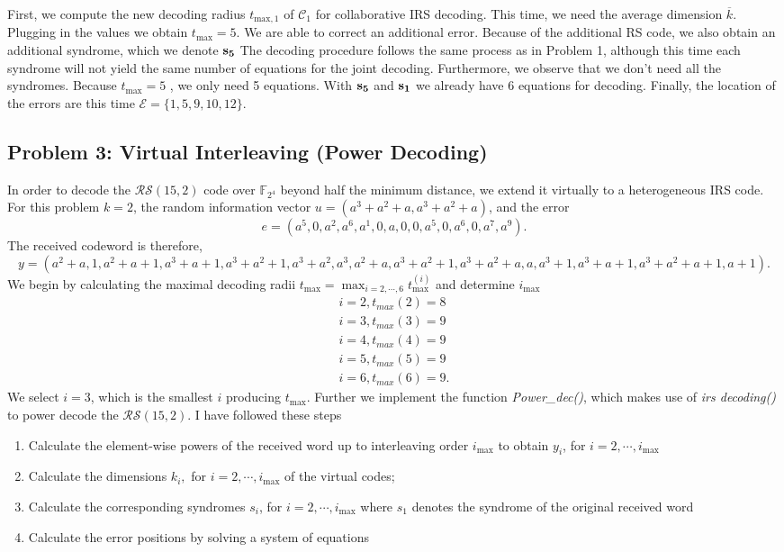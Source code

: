 \documentclass{article}
\begin{document}
First, we compute the new decoding radius $t_{\text{max},1}$ of $\mathcal{C}_1$ for collaborative IRS decoding. This time, we need the average dimension $\overline{k}$. Plugging in the values we obtain $t_{\text{max}} = 5$. We are able to correct an additional error. Because of the additional RS code, we also obtain an additional syndrome, which we denote $\vb{s_5}$
The decoding procedure follows the same process as in Problem 1, although this time each syndrome will not yield the same number of equations for the joint decoding. Furthermore, we observe that we don't need all the syndromes. Because  $t_{\text{max}} = 5$ , we only need 5 equations. With  $\vb{s_5}$  and  $\vb{s_1}$  we already have 6 equations for decoding. Finally, the location of the errors are this time $\mathcal{E} = \{1, 5, 9, 10, 12\}$.

\subsection*{Problem 3: Virtual Interleaving (Power Decoding)}
In order to decode the $\mathcal{RS}(15, 2)$ code over $\mathbb{F}_{2^4}$ beyond half the minimum distance, we extend it virtually to a heterogeneous IRS code. For this problem $k=2$, the random information vector $u=(a^3 + a^2 + a, a^3 + a^2 + a)$, and the error
\begin{equation*}
e=(a^5, 0, a^2, a^6, a^1, 0, a, 0, 0, a^5, 0, a^6, 0, a^7, a^9).
\end{equation*}
The received codeword is therefore,
\begin{equation*}
y=(a^2 + a, 1, a^2 + a + 1, a^3 + a + 1, a^3 + a^2 + 1, a^3 + a^2, a^3, a^2 + a, a^3 + a^2 + 1, a^3 + a^2 + a, a, a^3 + 1, a^3 + a + 1, a^3 + a^2 + a + 1, a + 1).
\end{equation*} 
We begin by calculating the maximal decoding radii $t_{\text{max}} =\max_{i=2,\cdots,6}t_{\text{max}}^{(i)}$ and determine $i_{\text{max}}$
\begin{align*}
i=2, t_{max}(2) = 8\\
i=3, t_{max}(3) = 9\\
i=4, t_{max}(4) = 9\\
i=5, t_{max}(5) = 9\\
i=6, t_{max}(6) = 9.
\end{align*}
We select $i=3$, which is the smallest $i$ producing $t_{\text{max}}$. Further we implement the function \textit{Power\_dec()}, which makes use of \textit{irs decoding()} to power decode the $\mathcal{RS}(15, 2)$. I have followed these steps
\begin{enumerate}
\item Calculate the element-wise powers of the received word up to interleaving order $i_{\text{max}}$ to obtain $y_i$, for $i = 2, \cdots, i_{\text{max}}$
\item Calculate the dimensions $k_i,$ for $i = 2, \cdots, i_{\text{max}}$ of the virtual codes;
\item Calculate the corresponding syndromes $s_i$, for $i = 2, \cdots, i_{\text{max}}$ where $s_1$ denotes the syndrome of the original received word
\item Calculate the error positions by solving a system of equations
\end{enumerate}
\end{document}
